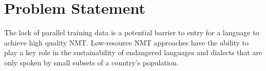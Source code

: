 %
%
%
%
%


\section{Problem Statement}
The lack of parallel training data is a potential barrier to entry for a language to achieve high quality NMT. Low-resource NMT approaches have the ability to play a key role in the sustainability of endangered languages and dialects that are only spoken by small subsets of a country's population.

